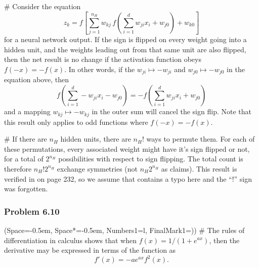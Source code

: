 \documentclass[12pt, a4paper]{article}
\newcommand{\listSpace}{-0.5em}%
\begin{document}
{\begin{easylist}[enumerate]
# Consider the equation
\begin{equation*}
	z_k = f\left[
	\sum_{j=1}^{n_H} w_{kj} \, f \left( \sum_{i=1}^{d} w_{ji} x_i + w_{j0} \right) + w_{k0}
	\right]
\end{equation*}
for a neural network output.
If the sign is flipped on every weight going into a hidden unit, and the weights leading out from that same unit are also flipped, then the net result is no change if the activation function obeys $f(-x) = -f(x)$.
In other words, if the $w_{ji} \mapsto -w_{ji}$ and $w_{j0} \mapsto - w_{j0}$ in the equation above, then 
\begin{equation*}
	f \left( \sum_{i=1}^{d} -w_{ji} x_i - w_{j0} \right) = -f \left( \sum_{i=1}^{d} w_{ji} x_i + w_{j0} \right)
\end{equation*}
and a mapping $w_{kj} \mapsto -w_{kj}$ in the outer sum will cancel the sign flip.
Note that this result only applies to odd functions where $f(-x) = -f(x)$.

# If there are $n_H$ hidden units, there are $n_H!$ ways to permute them.
For each of these permutations, every associated weight might have it's sign flipped or not, for a total of $2^{n_H}$ possibilities with respect to sign flipping.
The total count is therefore $n_H! 2^{n_H}$ exchange symmetries (not $n_H 2^{n_H}$ as \cite{duda_pattern_2000} claims).
This result is verified in \cite{bishop_pattern_2011} on page 232, so we assume that \cite{duda_pattern_2000} contains a typo here and the ``!'' sign was forgotten.

\end{easylist}

\subsubsection*{Problem 6.10}
\begin{easylist}[enumerate]
	\ListProperties(Space=\listSpace, Space*=\listSpace, Numbers1=l, FinalMark1={)})
	# The rules of differentiation in calculus shows that when $f(x) = 1 /(1 + e^{ax} )$, then the derivative may be expressed in terms of the function as
	\begin{equation*}
		f'(x) = -a e^{ax} f^2(x).
	\end{equation*}
	

\end{easylist}}
\end{document}
